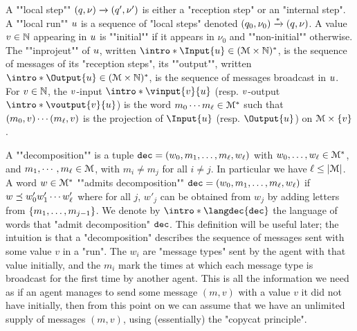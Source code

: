 	\AP A ""local step"" $(q,\nu) \xrightarrow{} (q',\nu')$ is either a "reception step" or an "internal step". 
	\AP A ""local run"" $u$ is a sequence of "local steps" denoted $(q_0, \nu_0) \xrightarrow{*} (q, \nu)$.
	A value $v \in \mathbb{N}$ appearing in $u$ is ""initial"" if it appears in $\nu_0$ and ""non-initial"" otherwise. 
	The ""inprojeut"" of $u$, written $\intro*\Input{\localrun} \in (\messages \times \nats)^*$, is the sequence of messages of its "reception steps", its ""output"", written $\intro*\Output{\localrun} \in (\messages \times \nats)^*$, is the sequence of messages broadcast in $u$. 
	For $v \in \mathbb{N}$, the $v$-input $\intro*\vinput{\aval}{\localrun}$ (resp. $v$-output $\intro*\voutput{\aval}{\localrun}$) is the word $m_0 \cdots m_{\ell} \in \mathcal{M}^*$ such that $(m_0, v) \cdots (m_{\ell}, v)$ is the projection of $\Input{\localrun}$ (resp. $\Output{\localrun}$) on $\mathcal{M} \times \{v\}$. 
 
	A ""decomposition"" is a tuple $\mathtt{dec} = (w_0, m_1, \ldots, m_\ell, w_\ell)$ with $w_0, \ldots, w_\ell \in \mathcal{M}^*$, and $m_1, \cdots, m_\ell \in \mathcal{M}$, with $m_i \neq m_j$ for all $i\neq j$. In particular we have $\ell \leq |\mathcal{M}|$. 
	A word $w \in \mathcal{M}^*$ ""admits decomposition"" $\mathtt{dec} = (w_0, m_1, \ldots, m_\ell, w_\ell)$ if $w \preceq w'_0 w'_1 \cdots w'_\ell$ where for all $j$, $w'_j$ can be obtained from $w_j$ by adding letters from $\{m_1, \ldots, m_{j-1}\}$. 
	We denote by $\intro*\langdec{\decsymb}$ the language of words that "admit decomposition" $\mathtt{dec}$. 
	This definition will be useful later; the intuition is that a "decomposition" describes the sequence of messages sent with some value $v$ in a "run". The $w_i$ are "message types" sent by the agent with that value initially, and the $m_i$ mark the times at which each message type is broadcast for the first time by another agent. This is all the information we need as if an agent manages to send some message $(m,v)$ with a value $v$ it did not have initially, then from this point on we can assume that we have an unlimited supply of messages $(m,v)$, using (essentially) the "copycat principle".  

